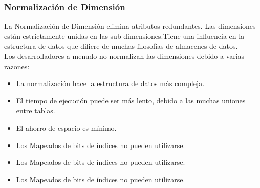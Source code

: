 \documentclass[11pt,a4paper]{article}
\begin{document}
		\subsubsection{Normalización de Dimensión}
		La Normalización de Dimensión elimina atributos redundantes. Las dimensiones están estrictamente unidas en las sub-dimensiones.Tiene una influencia en la estructura de datos que difiere de muchas filosofías de almacenes de datos.\\
		Los desarrolladores a menudo no normalizan las dimensiones debido a varias razones:
		\begin{itemize}
			\item La normalización hace la estructura de datos más compleja.
			\item El tiempo de ejecución puede ser más lento, debido a las muchas uniones entre tablas.
			\item El ahorro de espacio es mínimo.
			\item Los Mapeados de bits de índices no pueden utilizarse.
			\item Los Mapeados de bits de índices no pueden utilizarse.
			\item Los Mapeados de bits de índices no pueden utilizarse.
		\end{itemize}

	
		
	 	
	 	
	
	
	
	
\end{document}
